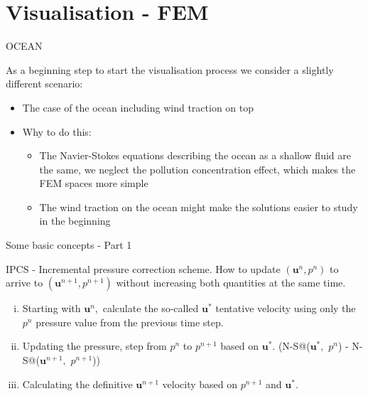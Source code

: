\documentclass{beamer}
\begin{document}
\section{Visualisation - FEM}

\begin{frame}{OCEAN}

    As a beginning step to start the visualisation process we consider a slightly different scenario:
    \begin{itemize}
      \item The case of the ocean including wind traction on top
      \item Why to do this:
        \begin{itemize}
          \item The Navier-Stokes equations describing the ocean as a shallow fluid are the same, we neglect the pollution concentration effect, which makes the FEM spaces more simple
          \item The wind traction on the ocean might make the solutions easier to study in the beginning
        \end{itemize}
    \end{itemize}
    
\end{frame}

\begin{frame}{Some basic concepts - Part 1}

IPCS - Incremental pressure correction scheme. How to update $(\mathbf{u}^n, p^n)$ to arrive to $(\mathbf{u}^{n+1}, p^{n+1})$ without increasing both quantities at the same time.

\begin{enumerate}[i)]
  \item Starting with $\mathbf{u}^n,$ calculate the so-called $\mathbf{u}^*$ tentative velocity using only the $p^n$ pressure value from the previous time step.
  \item Updating the pressure, step from $p^n$ to $p^{n+1}$ based on $\mathbf{u}^*.$ (N-S@($\mathbf{u}^*,$ $p^n$) - N-S@($\mathbf{u}^{n+1},$ $p^{n+1}$))
  \item Calculating the definitive $\mathbf{u}^{n+1}$ velocity based on $p^{n+1}$ and $\mathbf{u}^*.$
\end{enumerate}

\end{frame}
\end{document}
